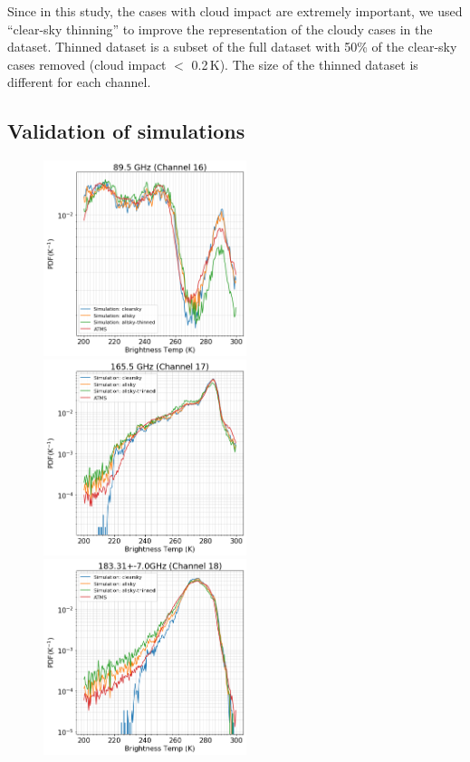 \documentclass[12pt]{article}
\begin{document}
Since in this study, the cases with cloud impact are extremely important, we used ``clear-sky thinning'' to improve the representation of the cloudy cases in the dataset. Thinned dataset is a subset of the full dataset with 50\% of the clear-sky cases removed (cloud impact $<$ 0.2\,K). The size of the thinned dataset is different for each channel. 

\subsection{Validation of simulations}
\label{sec:validation}
%

\begin{figure}[p]
	\centering
	\includegraphics[height=57mm]{ATMS_C16_distribution}\hspace{5mm}%
	\includegraphics[height=57mm]{ATMS_C17_distribution}
	\includegraphics[height=57mm]{ATMS_C18_distribution}\hspace{5mm}%

\end{figure}
\end{document}
